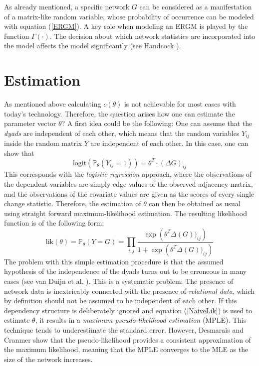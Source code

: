 \documentclass[headsepline=true, abstracton]{scrartcl}
\begin{document}
%
As already mentioned, a specific network $G$ can be considered as a manifestation of a matrix-like random variable, whose probability of occurrence can be modeled with equation (\ref{ERGM}).
A key role when modeling an ERGM is played by the function $\Gamma(\cdot)$. The decision about which network statistics are incorporated into the model affects the model significantly (see Handcock \cite{Handcock.2003}).

\section*{Estimation}
As mentioned above calculating $c(\theta)$ is not achievable for most cases with today's technology. Therefore, the question arises how one can estimate the parameter vector $\theta$?
A first idea could be the following: One can assume that the \textit{dyads} are independent of each other, which means that the random variables $Y_{ij}$ inside the random matrix $Y$ are independent of each other. 
In this case, one can show that
%
\begin{equation*}
\text{logit}(\mathbb{P}_{\theta}(Y_{ij}=1))= \theta^T \cdot (\Delta G)_{ij}
\end{equation*}
This corresponds with the \textit{logistic regression} approach, where the observations of the dependent variables are simply edge values of the observed adjacency matrix, and the observations of the covariate values are given as the scores of every single change statistic. Therefore, the estimation of $\theta$ can then be obtained as usual using straight forward maximum-likelihood estimation. The resulting likelihood function is of the following form:
\begin{equation}
\text{lik}(\theta)= \mathbb{P}_{\theta}(Y=G)= \prod_{i,j} \dfrac{ \exp \left(\theta^T \Delta(G))_{ij} \right)}{1+\exp \left(\theta^T \Delta(G))_{ij} \right)}
\label{NaiveLik}
\end{equation}
The problem with this simple estimation procedure is that the assumed hypothesis of the independence of the dyads turns out to be erroneous in many cases (see van Duijn et al. \cite{vanDuijnetal2009}). This is a systematic problem: The presence of network data is inextricably connected with the presence of \textit{relational data}, which by definition should not be assumed to be independent of each other. If this dependency structure is deliberately ignored and equation (\ref{NaiveLik}) is used to estimate $\theta$, it results in a \textit{maximum pseudo-likelihood estimation} (MPLE). This technique tends to underestimate the standard error. However, Desmarais and Cranmer \cite{Desmarais.2012} show that the pseudo-likelihood provides a consistent approximation of the maximum likelihood, meaning that the MPLE converges to the MLE as the size of the network increases.\\[0.3cm]
\end{document}
